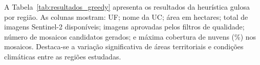 \documentclass[a4paper,11pt]{article}
\begin{document}
A Tabela~\ref{tab:resultados_greedy} apresenta os resultados da heurística gulosa por região. As colunas mostram: UF; nome da UC; área em hectares; total de imagens Sentinel-2 disponíveis; imagens aprovadas pelos filtros de qualidade; número de mosaicos candidatos gerados; e máxima cobertura de nuvens (\%) nos mosaicos. Destaca-se a variação significativa de áreas territoriais e condições climáticas entre as regiões estudadas.
\setlength{\LTcapwidth}{\textwidth}
\setlength{\LTleft}{0pt}
\setlength{\LTright}{0pt}

\footnotesize  %
\setlength{\tabcolsep}{2.5pt}  %
\renewcommand{\arraystretch}{0.95}  %
\end{document}

